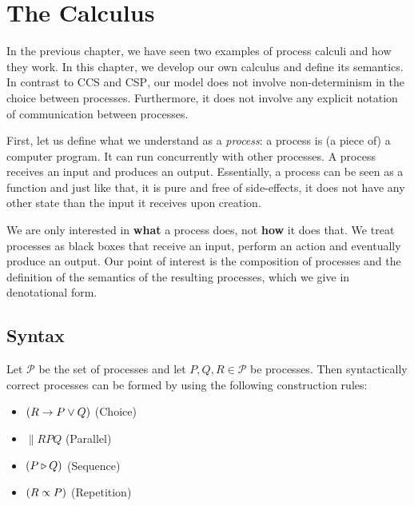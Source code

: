 \chapter{The Calculus}
\label{chp:algebraic_model}
\label{chp:calculus}
In the previous chapter, we have seen two examples of process calculi and how they work. In this chapter, we develop our own calculus and define its semantics. In contrast to \textsc{CCS} and \textsc{CSP}, our model does not involve non-determinism in the choice between processes. Furthermore, it does not involve any explicit notation of communication between processes.

First, let us define what we understand as a \textit{process}: a process is (a piece of) a computer program. It can run concurrently with other processes. A process receives an input and produces an output. Essentially, a process can be seen as a function and just like that, it is pure and free of side-effects, it does not have any other state than the input it receives upon creation.

We are only interested in \textbf{what} a process does, not \textbf{how} it does that. We treat processes as black boxes that receive an input, perform an action and eventually produce an output. Our point of interest is the composition of processes and the definition of the semantics of the resulting processes, which we give in denotational form.

\section{Syntax}
\label{chp:syntax}
Let $\mathcal{P}$ be the set of processes and let $P, Q, R \in \mathcal{P}$ be processes. Then syntactically correct processes can be formed by using the following construction rules:
\begin{itemize}
  \item $\left( R \to P \vee Q \right)$ \hspace*{2.3em} (Choice)
  \item $\parallel{R}{P}{Q}$ \hspace*{2.8em} (Parallel)
  \item $\left( P \triangleright Q \right)$ \hspace*{4.8em} (Sequence)
  \item $\left( R \propto P \right)$ \hspace*{4.4em} (Repetition)
\end{itemize}

